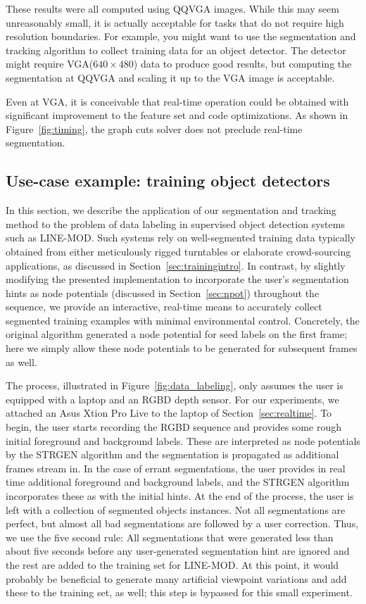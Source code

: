 \documentclass[journal]{IEEEtran}
\newcommand{\vga}{VGA\xspace}
\newcommand{\qqvga}{QQVGA\xspace}
\begin{document}
These results were all computed using \qqvga images.  While this may seem unreasonably small, it is actually acceptable for tasks that do not require high resolution boundaries.  For example, you might want to use the segmentation and tracking algorithm to collect training data for an object detector.  The detector might require \vga (\ie $640 \times 480$) data to produce good results, but computing the segmentation at \qqvga and scaling it up to the \vga image is acceptable.

Even at \vga, it is conceivable that real-time operation could be obtained with significant improvement to the feature set and code optimizations.  As shown in Figure~\ref{fig:timing}, the graph cuts solver does not preclude real-time segmentation.

\subsection{Use-case example: training object detectors}
\label{sec:example}

In this section, we describe the application of our segmentation and tracking method to the problem of data labeling in supervised object detection systems such as LINE-MOD. Such systems rely on well-segmented training data typically obtained from either meticulously rigged turntables or elaborate crowd-sourcing applications, as discussed in Section~\ref{sec:trainingintro}. In contrast, by slightly modifying the presented implementation to incorporate the user's segmentation hints as node potentials (discussed in Section~\ref{sec:npot}) throughout the sequence, we provide an interactive, real-time means to accurately collect segmented training examples with minimal environmental control.  Concretely, the original algorithm generated a node potential for seed labels on the first frame; here we simply allow these node potentials to be generated for subsequent frames as well.

The process, illustrated in Figure~\ref{fig:data_labeling}, only assumes the user is equipped with a laptop and an RGBD depth sensor.  For our experiments, we attached an Asus Xtion Pro Live to the laptop of Section~\ref{sec:realtime}. To begin, the user starts recording the RGBD sequence and provides some rough initial foreground and background labels. These are interpreted as node potentials by the STRGEN algorithm and the segmentation is propagated as additional frames stream in.  In the case of errant segmentations, the user provides in real time additional foreground and background labels, and the STRGEN algorithm incorporates these as with the initial hints.  At the end of the process, the user is left with a collection of segmented objects instances.  Not all segmentations are perfect, but almost all bad segmentations are followed by a user correction.  Thus, we use the five second rule: All segmentations that were generated less than about five seconds before any user-generated segmentation hint are ignored and the rest are added to the training set for LINE-MOD.  At this point, it would probably be beneficial to generate many artificial viewpoint variations and add these to the training set, as well; this step is bypassed for this small experiment.
\end{document}
